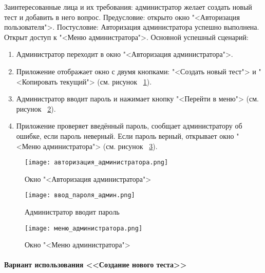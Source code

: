 Заинтересованные лица и их требования: администратор желает создать новый тест и добавить в него вопрос.
\newline Предусловие: открыто окно "<Авторизация пользователя">.
\newline Постусловие: Авторизация администратора успешно выполнена. Открыт доступ к "<Меню администратора">.
\newline Основной успешный сценарий:
\begin{enumerate}
	\item Администратор переходит в окно "<Авторизация администратора">.
	\item Приложение отображает окно с двумя кнопками: "<Создать новый тест"> и "<Копировать текущий"> (см. рисунок ~\ref{admin_auth_window:image}).
	\item Администратор вводит пароль и нажимает кнопку "<Перейти в меню"> (см. рисунок ~\ref{admin_password:image}).
	\item Приложение проверяет введённый пароль, сообщает администратору об ошибке, если пароль неверный. Если пароль верный, открывает окно "<Меню администратора"> (см. рисунок ~\ref{admin_menu_1:image}).
\end{enumerate}

\begin{figure}[ht]
	\centering
	\texttt{[image: авторизация\_администратора.png]}
	\caption{Окно "<Авторизация администратора">}
	\label{admin_auth_window:image}
\end{figure}
\begin{figure}[H]
	\centering
	\texttt{[image: ввод\_пароля\_админ.png]}
	\caption{Администратор вводит пароль}
	\label{admin_password:image}
\end{figure}
\begin{figure}[H]
	\centering
	\texttt{[image: меню\_администратора.png]}
	\caption{Окно "<Меню администратора">}
	\label{admin_menu_1:image}
\end{figure}

\paragraph{Вариант использования <<Создание нового теста>>}

